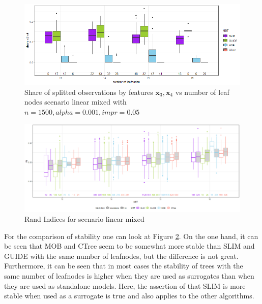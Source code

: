 \begin{figure}[!htb]
\centering
    \includegraphics[width=14cm]{Figures/simulations/batchtools/basic_scenarios/linear_mixed/lm_1000_standalone_share_x3x4.png}
    \caption{Share of splitted observations by features $\textbf{x}_3, \textbf{x}_4$ vs number of leaf nodes scenario linear mixed with $n=1500, alpha = 0.001, impr = 0.05$}
    \label{fig:lm_1000_standalone_share_x3x4}

\end{figure} 




\begin{figure}[!htb]
    \includegraphics[width=16cm]{Figures/simulations/batchtools/basic_scenarios/linear_mixed/lm_1000_standalone_lm_sta.png}
    \caption{Rand Indices for scenario linear mixed}
    \label{fig:lm_1000_standalone_lm_sta}
\end{figure}

For the comparison of stability one can look at Figure \ref{fig:lm_1000_standalone_lm_sta}. On the one hand, it can be seen that MOB and CTree seem to be somewhat more stable than SLIM and GUIDE with the same number of leafnodes, but the difference is not great. Furthermore, it can be seen that in most cases the stability of trees with the same number of leafnodes is higher when they are used as surrogates than when they are used as standalone models. Here, the assertion of \citep{Hu.2020} that SLIM is more stable when used as a surrogate is true and also applies to the other algorithms.


